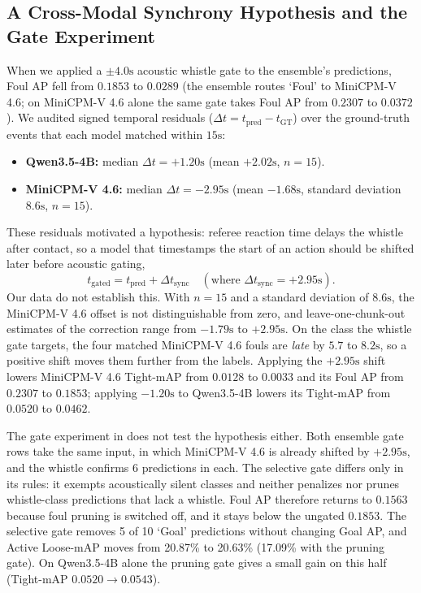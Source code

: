 \documentclass[10pt,twocolumn,letterpaper]{article}
\begin{document}
\subsection{A Cross-Modal Synchrony Hypothesis and the Gate Experiment}
When we applied a $\pm 4.0\text{s}$ acoustic whistle gate to the ensemble's predictions, Foul AP fell from $0.1853$ to $0.0289$ (the ensemble routes `Foul' to MiniCPM-V 4.6; on MiniCPM-V 4.6 alone the same gate takes Foul AP from $0.2307$ to $0.0372$).
We audited signed temporal residuals ($\Delta t = t_{\text{pred}} - t_{\text{GT}}$) over the ground-truth events that each model matched within $15\text{s}$:
\begin{itemize}
    \item \textbf{Qwen3.5-4B:} median $\Delta t = +1.20\text{s}$ (mean $+2.02\text{s}$, $n=15$).
    \item \textbf{MiniCPM-V 4.6:} median $\Delta t = -2.95\text{s}$ (mean $-1.68\text{s}$, standard deviation $8.6\text{s}$, $n=15$).
\end{itemize}
These residuals motivated a hypothesis: referee reaction time delays the whistle after contact, so a model that timestamps the start of an action should be shifted later before acoustic gating,
\begin{equation}
    t_{\text{gated}} = t_{\text{pred}} + \Delta t_{\text{sync}} \quad (\text{where } \Delta t_{\text{sync}} = +2.95\text{s}).
\end{equation}
Our data do not establish this. With $n=15$ and a standard deviation of $8.6\text{s}$, the MiniCPM-V 4.6 offset is not distinguishable from zero, and leave-one-chunk-out estimates of the correction range from $-1.79\text{s}$ to $+2.95\text{s}$. On the class the whistle gate targets, the four matched MiniCPM-V 4.6 fouls are \emph{late} by $5.7$ to $8.2\text{s}$, so a positive shift moves them further from the labels. Applying the $+2.95\text{s}$ shift lowers MiniCPM-V 4.6 Tight-mAP from $0.0128$ to $0.0033$ and its Foul AP from $0.2307$ to $0.1853$; applying $-1.20\text{s}$ to Qwen3.5-4B lowers its Tight-mAP from $0.0520$ to $0.0462$.

The gate experiment in  does not test the hypothesis either. Both ensemble gate rows take the same input, in which MiniCPM-V 4.6 is already shifted by $+2.95\text{s}$, and the whistle confirms 6 predictions in each. The selective gate differs only in its rules: it exempts acoustically silent classes and neither penalizes nor prunes whistle-class predictions that lack a whistle. Foul AP therefore returns to $0.1563$ because foul pruning is switched off, and it stays below the ungated $0.1853$. The selective gate removes 5 of 10 `Goal' predictions without changing Goal AP, and Active Loose-mAP moves from 20.87\% to 20.63\% (17.09\% with the pruning gate). On Qwen3.5-4B alone the pruning gate gives a small gain on this half (Tight-mAP $0.0520 \to 0.0543$).
\end{document}
